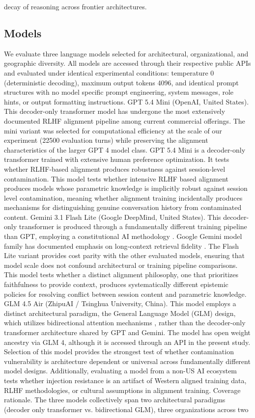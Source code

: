 \documentclass[manuscript, screen, review]{jair}
\begin{document}
decay of reasoning across frontier architectures.

\subsection{Models}

We evaluate three language models selected for architectural, organizational, and geographic diversity. All models are accessed through their respective public APIs and evaluated under identical experimental conditions: temperature 0 (deterministic decoding), maximum output tokens 4096, and identical prompt structures with no model specific prompt engineering, system messages, role hints, or output formatting instructions. GPT 5.4 Mini (OpenAI, United States). This decoder-only transformer model has undergone the most extensively documented RLHF alignment pipeline among current commercial offerings. The mini variant was selected for computational efficiency at the scale of our experiment (22500 evaluation turns) while preserving the alignment characteristics of the larger GPT 4 model class. GPT 5.4 Mini is a decoder-only transformer trained with extensive human preference optimization. It tests whether RLHF-based alignment produces robustness against session-level contamination. This model tests whether intensive RLHF based alignment produces models whose parametric knowledge is implicitly robust against session level contamination, meaning whether alignment training incidentally produces mechanisms for distinguishing genuine conversation history from contaminated content. Gemini 3.1 Flash Lite (Google DeepMind, United States). This decoder-only transformer is produced through a fundamentally different training pipeline than GPT, employing a constitutional AI methodology \parencite{bai2022constitutional}. Google Gemini model family has documented emphasis on long-context retrieval fidelity \parencite{gemini2024gemini15}. The Flash Lite variant provides cost parity with the other evaluated models, ensuring that model scale does not confound architectural or training pipeline comparisons. This model tests whether a distinct alignment philosophy, one that prioritizes faithfulness to provide context, produces systematically different epistemic policies for resolving conflict between session content and parametric knowledge. GLM 4.5 Air (ZhipuAI / Tsinghua University, China). This model employs a distinct architectural paradigm, the General Language Model (GLM) design, which utilizes bidirectional attention mechanisms \parencite{du2022glm}, rather than the decoder-only transformer architecture shared by GPT and Gemini. The model has open weight ancestry via GLM 4, although it is accessed through an API in the present study. Selection of this model provides the strongest test of whether contamination vulnerability is architecture dependent or universal across fundamentally different model designs. Additionally, evaluating a model from a non-US AI ecosystem tests whether injection resistance is an artifact of Western aligned training data, RLHF methodologies, or cultural assumptions in alignment training. Coverage rationale. The three models collectively span two architectural paradigms (decoder only transformer vs. bidirectional GLM), three organizations across two 
\end{document}
